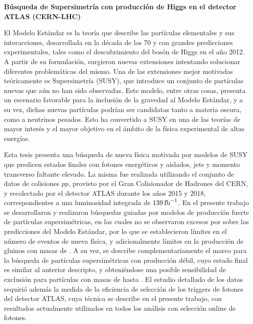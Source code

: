 \thispagestyle{empty}

{\centering \bf \Large  Búsqueda de Supersimetría con producción de Higgs en el detector ATLAS (CERN-LHC)\\}

\vspace{2cm}

El Modelo Estándar es la teoría que describe las partículas elementales y sus interacciones, desarrollada en la década de los 70 y con grandes predicciones experimentales, tales como el descubrimiento del bosón de Higgs en el año 2012. A partir de su formulación, surgieron nuevas extensiones intentando solucionar diferentes problemáticas del mismo. Una de las extensiones mejor motivadas teóricamente es Supersimetría (SUSY), que introduce un conjunto de partículas nuevas que aún no han sido observadas. Este modelo, entre otras cosas, presenta un escenario favorable para la inclusión de la gravedad al Modelo Estándar, y a su vez, dichas nuevas partículas podrían ser candidatas tanto a materia oscura, como a neutrinos pesados. Esto ha convertido a SUSY en una de las teorías de mayor interés y el mayor objetivo en el ámbito de la física experimental de altas energías.

Esta tesis presenta una búsqueda de nueva física motivada por modelos de SUSY que predicen estados finales con fotones energéticos y aislados, jets y momento transverso faltante elevado. La misma fue realizada utilizando el conjunto de datos de colisiones $pp$, provisto por el Gran Colisionador de Hadrones del CERN, y recolectado por el detector ATLAS durante los años 2015 y 2018, correspondientes a una luminosidad integrada de $139\,\text{fb}^{-1}$. En el presente trabajo se desarrollaron y realizaron búsquedas guiadas por modelos de producción fuerte de partículas supersimétricas, en las cuales no se observaron excesos por sobre las predicciones del Modelo Estándar, por lo que se establecieron límites en el número de eventos de nueva física, y adicionalmente límites en la producción de gluinos con masas de . A su vez, se describe complementariamente el marco para la búsqueda de partículas supersimétricas con producción débil, cuyo estado final es similar al anterior descripto, y obteniéndose una posible sensibilidad de exclusión para partículas con masas de hasta .
El estudio detallado de los datos requirió además la medida de la eficiencia de selección de los triggers de fotones del detector ATLAS, cuya técnica se describe en el presente trabajo, con resultados actualmente utilizados en todos los análisis con selección online de fotones.

